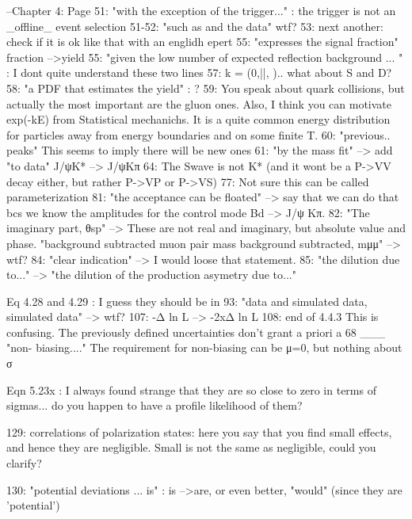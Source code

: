 --Chapter 4:
Page 51: "with the exception of the trigger..." : the trigger is not an _offline_ event selection
51-52: "such as and the data" wtf?
53: next another: check if it is ok like that with an englidh epert
55: "expresses the signal fraction" fraction -->yield
55: "given the low number of expected reflection background ... " : I dont quite understand these two lines
57: k = (0,||, \perp).. what about S and D?
58: "a PDF that estimates the yield" : ?
59: You speak about quark collisions, but actually the most important are the gluon ones. Also, I think you
can motivate exp(-kE) from Statistical mechanichs. It is a quite common energy distribution for particles  away
from energy boundaries and on some finite T.
60: "previous.. peaks" This seems to imply there will be new ones
61: "by the mass fit" --> add "to data"
     J/ψΚ* --> J/ψΚπ
64: The Swave is not K* (and it wont be a P->VV decay either, but rather P->VP or P->VS)
77: Not sure this can be called parameterization
81: "the acceptance can be floated" --> say that we can do that bcs we know the amplitudes for the control
mode Bd --> J/ψ Κπ.
82: "The imaginary part, θsp" --> These are not real and imaginary, but absolute value and phase.
   "background subtracted muon pair mass background subtracted, mμμ" --> wtf?
84: "clear indication" --> I would loose that statement.
85: "the dilution due to..." --> "the dilution of the production asymetry due to..."

Eq 4.28 and 4.29 : I guess they should be in %
93: "data and simulated data, simulated data" --> wtf?
107: -Δ ln L --> -2xΔ ln L
108:  end of 4.4.3 This is confusing. The previously defined uncertainties don't grant a priori a 68%
___ "non- biasing...." The requirement for non-biasing can be μ=0, but nothing about σ

Eqn 5.23x : I always found strange that they are so close to zero in terms of sigmas... do you happen to
have a profile likelihood of them?

129:   correlations of polarization states: here you say that you find small effects, and hence they are
negligible. Small is not the same as negligible, could you clarify?

130: "potential deviations ... is" : is -->are, or even better, "would" (since they are 'potential')
